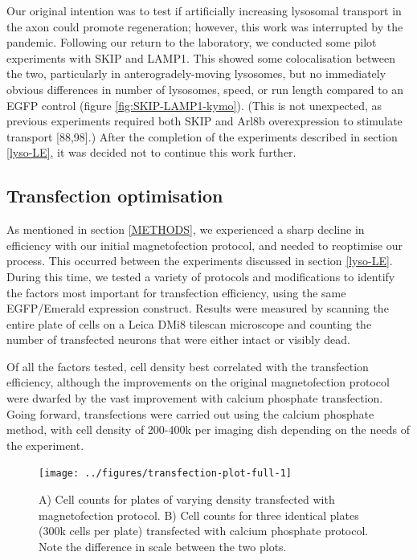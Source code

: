 \documentclass[
  12pt,
  a4paper,
]{book}
\begin{document}
Our original intention was to test if artificially increasing lysosomal transport in the axon could promote regeneration; however, this work was interrupted by the pandemic. Following our return to the laboratory, we conducted some pilot experiments with SKIP and LAMP1. This showed some colocalisation between the two, particularly in anterogradely-moving lysosomes, but no immediately obvious differences in number of lysosomes, speed, or run length compared to an EGFP control (figure \ref{fig:SKIP-LAMP1-kymo}). (This is not unexpected, as previous experiments required both SKIP and Arl8b overexpression to stimulate transport {[}88,98{]}.) After the completion of the experiments described in section \ref{lyso-LE}, it was decided not to continue this work further.

\hypertarget{transfection-optimisation}{%
\subsection{Transfection optimisation}\label{transfection-optimisation}}

As mentioned in section \ref{METHODS}, we experienced a sharp decline in efficiency with our initial magnetofection protocol, and needed to reoptimise our process. This occurred between the experiments discussed in section \ref{lyso-LE}. During this time, we tested a variety of protocols and modifications to identify the factors most important for transfection efficiency, using the same EGFP/Emerald expression construct. Results were measured by scanning the entire plate of cells on a Leica DMi8 tilescan microscope and counting the number of transfected neurons that were either intact or visibly dead.

Of all the factors tested, cell density best correlated with the transfection efficiency, although the improvements on the original magnetofection protocol were dwarfed by the vast improvement with calcium phosphate transfection. Going forward, transfections were carried out using the calcium phosphate method, with cell density of 200-400k per imaging dish depending on the needs of the experiment.

\begin{figure}[h]
\texttt{[image: ../figures/transfection-plot-full-1]} \caption[Transfection optimisation plot]{A) Cell counts for plates of varying density transfected with magnetofection protocol.  B) Cell counts for three identical plates (300k cells per plate) transfected with calcium phosphate protocol.  Note the difference in scale between the two plots.}\label{fig:transfection-plot-full}
\end{figure}
\end{document}
